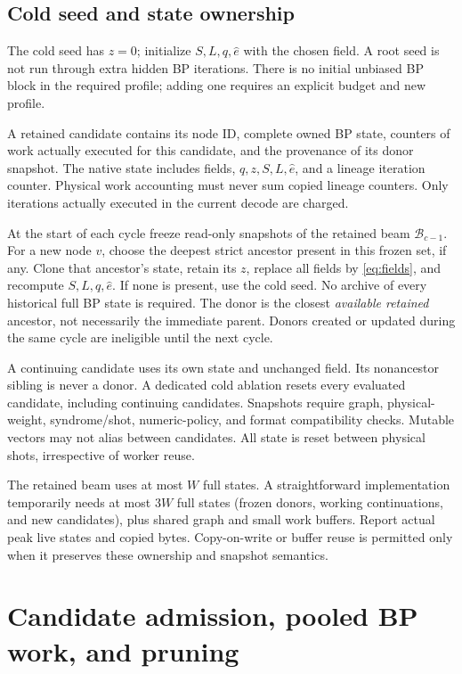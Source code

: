 \documentclass[11pt,a4paper]{article}
\begin{document}
\subsection{Cold seed and state ownership}
The cold seed has $z=0$; initialize $S,L,q,\hat e$ with the chosen field. A root seed is not run through extra hidden BP iterations. There is no initial unbiased BP block in the required profile; adding one requires an explicit budget and new profile.

A retained candidate contains its node ID, complete owned BP state, counters of work actually executed for this candidate, and the provenance of its donor snapshot. The native state includes fields, $q,z,S,L,\hat e$, and a lineage iteration counter. Physical work accounting must never sum copied lineage counters. Only iterations actually executed in the current decode are charged.

At the start of each cycle freeze read-only snapshots of the retained beam $\mathcal B_{c-1}$. For a new node $v$, choose the deepest strict ancestor present in this frozen set, if any. Clone that ancestor's state, retain its $z$, replace all fields by \eqref{eq:fields}, and recompute $S,L,q,\hat e$. If none is present, use the cold seed. No archive of every historical full BP state is required. The donor is the closest \emph{available retained} ancestor, not necessarily the immediate parent. Donors created or updated during the same cycle are ineligible until the next cycle.

A continuing candidate uses its own state and unchanged field. Its nonancestor sibling is never a donor. A dedicated cold ablation resets every evaluated candidate, including continuing candidates. Snapshots require graph, physical-weight, syndrome/shot, numeric-policy, and format compatibility checks. Mutable vectors may not alias between candidates. All state is reset between physical shots, irrespective of worker reuse.

The retained beam uses at most $W$ full states. A straightforward implementation temporarily needs at most $3W$ full states (frozen donors, working continuations, and new candidates), plus shared graph and small work buffers. Report actual peak live states and copied bytes. Copy-on-write or buffer reuse is permitted only when it preserves these ownership and snapshot semantics.

\section{Candidate admission, pooled BP work, and pruning}
\end{document}
